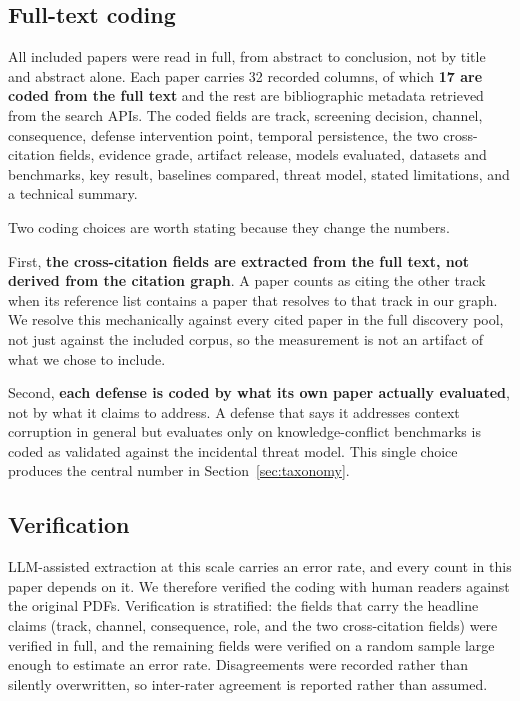 \subsection{Full-text coding}

All \NCorpus{} included papers were read in full, from abstract to conclusion, not by
title and abstract alone. Each paper carries 32 recorded columns, of which
\textbf{17 are coded from the full text} and the rest are bibliographic
metadata retrieved from the search APIs. The coded fields are track, screening
decision, channel, consequence, defense intervention point, temporal
persistence, the two cross-citation fields, evidence grade, artifact release,
models evaluated, datasets and benchmarks, key result, baselines compared,
threat model, stated limitations, and a technical summary.

Two coding choices are worth stating because they change the numbers.

First, \textbf{the cross-citation fields are extracted from the full text, not
derived from the citation graph}. A paper counts as citing the other track when
its reference list contains a paper that resolves to that track in our graph.
We resolve this mechanically against every cited paper in the full discovery
pool, not just against the included corpus, so the measurement is not an
artifact of what we chose to include.

Second, \textbf{each defense is coded by what its own paper actually evaluated},
not by what it claims to address. A defense that says it addresses context
corruption in general but evaluates only on knowledge-conflict benchmarks is
coded as validated against the incidental threat model. This single choice
produces the central number in Section~\ref{sec:taxonomy}.

\subsection{Verification}

LLM-assisted extraction at this scale carries an error rate, and every count in
this paper depends on it. We therefore verified the coding with human readers
against the original PDFs. Verification is stratified: the fields that carry
the headline claims (track, channel, consequence, role, and the two
cross-citation fields) were verified in full, and the remaining fields were
verified on a random sample large enough to estimate an error rate.
Disagreements were recorded rather than silently overwritten, so inter-rater
agreement is reported rather than assumed.

